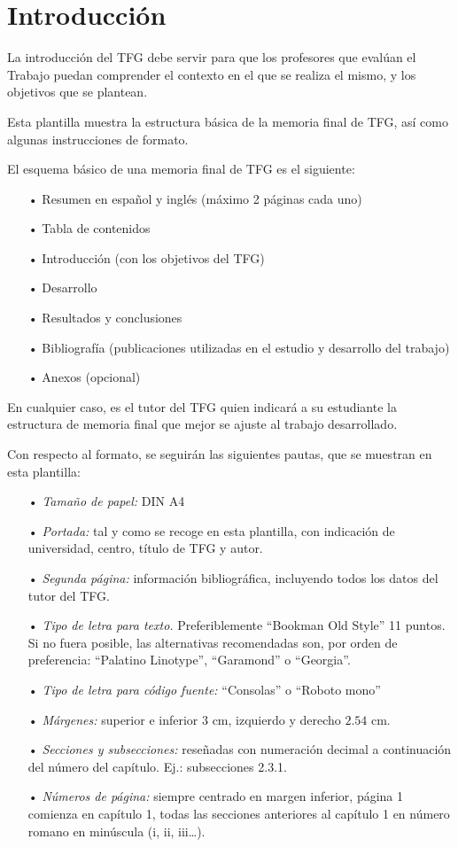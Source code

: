 \chapter{Introducción}
La introducción del TFG debe servir para que los profesores que evalúan el Trabajo puedan comprender el contexto en el que se realiza el mismo, y los objetivos que se plantean.

Esta plantilla muestra la estructura básica de la memoria final de TFG, así como algunas instrucciones de formato.

El esquema básico de una memoria final de TFG es el siguiente:
\begin{itemize}
\item[•] Resumen en español y inglés (máximo 2 páginas cada uno)
\item[•] Tabla de contenidos
\item[•] Introducción (con los objetivos del TFG)
\item[•] Desarrollo
\item[•] Resultados y conclusiones
\item[•] Bibliografía (publicaciones utilizadas en el estudio y desarrollo del trabajo)
\item[•] Anexos (opcional)
\end{itemize}

En cualquier caso, es el tutor del TFG quien indicará a su estudiante la estructura de memoria final que mejor se ajuste al trabajo desarrollado.

Con respecto al formato, se seguirán las siguientes pautas, que se muestran en esta plantilla:
\begin{itemize}
\item[•] \textit{Tamaño de papel:} DIN A4
\item[•] \textit{Portada:} tal y como se recoge en esta plantilla, con indicación de universidad, centro, título de TFG y autor.
\item[•] \textit{Segunda página:} información bibliográfica, incluyendo todos los datos del tutor del TFG.
\item[•] \textit{Tipo de letra para texto.} Preferiblemente “Bookman Old Style” 11 puntos. Si no fuera posible, las alternativas recomendadas son, por orden de preferencia: “Palatino Linotype”, “Garamond” o “Georgia”.
\item[•] \textit{Tipo de letra para código fuente:} “Consolas” o “Roboto mono”
\item[•] \textit{Márgenes:} superior e inferior $3$ cm, izquierdo y derecho $2.54$ cm.
\item[•] \textit{Secciones y subsecciones:} reseñadas con numeración decimal a continuación del número del capítulo. Ej.: subsecciones 2.3.1.
\item[•] \textit{Números de página:} siempre centrado en margen inferior, página 1 comienza en capítulo 1, todas las secciones anteriores al capítulo 1 en número romano en minúscula (i, ii, iii…).
\end{itemize}

